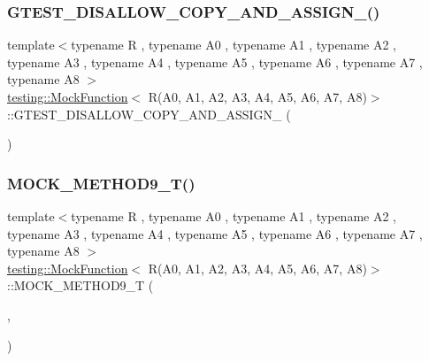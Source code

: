 \subsubsection{\texorpdfstring{G\+T\+E\+S\+T\+\_\+\+D\+I\+S\+A\+L\+L\+O\+W\+\_\+\+C\+O\+P\+Y\+\_\+\+A\+N\+D\+\_\+\+A\+S\+S\+I\+G\+N\+\_\+()}{GTEST\_DISALLOW\_COPY\_AND\_ASSIGN\_()}}
{\footnotesize\ttfamily template$<$typename R , typename A0 , typename A1 , typename A2 , typename A3 , typename A4 , typename A5 , typename A6 , typename A7 , typename A8 $>$ \\
\hyperlink{classtesting_1_1MockFunction}{testing\+::\+Mock\+Function}$<$ R(A0, A1, A2, A3, A4, A5, A6, A7, A8)$>$\+::G\+T\+E\+S\+T\+\_\+\+D\+I\+S\+A\+L\+L\+O\+W\+\_\+\+C\+O\+P\+Y\+\_\+\+A\+N\+D\+\_\+\+A\+S\+S\+I\+G\+N\+\_\+ (\begin{DoxyParamCaption}\item[{\hyperlink{classtesting_1_1MockFunction}{Mock\+Function}$<$ R(A0, A1, A2, A3, A4, A5, A6, A7, A8)$>$}]{ }\end{DoxyParamCaption})\hspace{0.3cm}{\ttfamily [private]}}

\mbox{\label{classtesting_1_1MockFunction_3_01R_07A0_00_01A1_00_01A2_00_01A3_00_01A4_00_01A5_00_01A6_00_01A7_00_01A8_08_4_a0fee6ada67063cc8ec8b2181021f0195}} 
\subsubsection{\texorpdfstring{M\+O\+C\+K\+\_\+\+M\+E\+T\+H\+O\+D9\+\_\+\+T()}{MOCK\_METHOD9\_T()}}
{\footnotesize\ttfamily template$<$typename R , typename A0 , typename A1 , typename A2 , typename A3 , typename A4 , typename A5 , typename A6 , typename A7 , typename A8 $>$ \\
\hyperlink{classtesting_1_1MockFunction}{testing\+::\+Mock\+Function}$<$ R(A0, A1, A2, A3, A4, A5, A6, A7, A8)$>$\+::M\+O\+C\+K\+\_\+\+M\+E\+T\+H\+O\+D9\+\_\+T (\begin{DoxyParamCaption}\item[{Call}]{,  }\item[{R(A0, A1, A2, A3, A4, A5, A6, A7, A8)}]{ }\end{DoxyParamCaption})}




